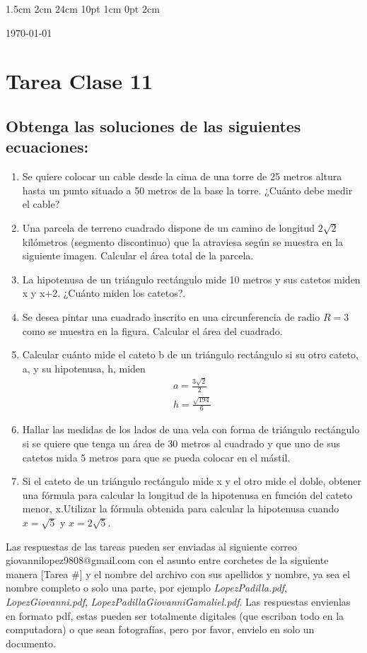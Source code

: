 \documentclass[12pt,letterpaper]{report}
\begin{document}
\setmargins{2.5cm}      
{1.5cm}                     
{2cm}  
{24cm}                    
{10pt}                          
{1cm}                          
{0pt}                             
{2cm}
\begin{flushright}
\today
\end{flushright}
\vspace{-1.75cm}
\section*{Tarea Clase 11}
\subsection*{Obtenga las soluciones de las siguientes ecuaciones:}
\begin{enumerate}
\item Se quiere colocar un cable desde la cima de una torre de 25 metros altura hasta un punto situado a 50 metros de la base la torre. ¿Cuánto debe medir el cable?
\item Una parcela de terreno cuadrado dispone de un camino de longitud $2\sqrt{2}$ kilómetros (segmento discontinuo) que la atraviesa según se muestra en la siguiente imagen. Calcular el área total de la parcela.
\item La hipotenusa de un triángulo rectángulo mide 10 metros y sus catetos miden x y x+2. ¿Cuánto miden los catetos?.
\item Se desea pintar una cuadrado inscrito en una circunferencia de radio 
$R=3$ como se muestra en la figura. Calcular el área del cuadrado.
\item Calcular cuánto mide el cateto b de un triángulo rectángulo si su otro cateto, a, y su hipotenusa, h, miden 
\begin{eqnarray*}
a=\frac{3\sqrt{2}}{2} \\
h=\frac{\sqrt{194}}{6}
\end{eqnarray*}
\item Hallar las medidas de los lados de una vela con forma de triángulo rectángulo si se quiere que tenga un área de 30 metros al cuadrado y que uno de sus catetos mida 5 metros para que se pueda colocar en el mástil.
\item Si el cateto de un triángulo rectángulo mide x y el otro mide el doble, obtener una fórmula para calcular la longitud de la hipotenusa en función del cateto menor, x.Utilizar la fórmula obtenida para calcular la hipotenusa cuando $x=\sqrt{5}$ y $x=2\sqrt{5}.$
\end{enumerate}
Las respuestas de las tareas pueden ser enviadas al siguiente correo giovannilopez9808@gmail.com con el asunto entre corchetes de la siguiente manera [Tarea \#] y el nombre del archivo con sus apellidos y nombre, ya sea el nombre completo o solo una parte, por ejemplo \textit{LopezPadilla.pdf}, \textit{LopezGiovanni.pdf}, \textit{LopezPadillaGiovanniGamaliel.pdf}. Las respuestas envienlas en formato pdf, estas pueden ser totalmente digitales (que escriban todo en la computadora) o que sean fotografías, pero por favor, envielo en solo un documento.
\end{document}
